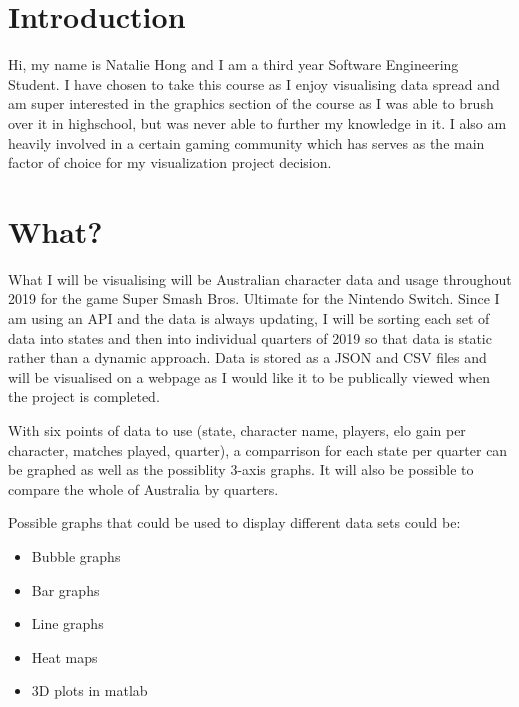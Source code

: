 \documentclass[11pt, oneside, a4paper]{article}
\begin{document}
\section*{Introduction}
Hi, my name is Natalie Hong and I am a third year Software Engineering Student. I have chosen to take this course as I enjoy visualising data spread and am super interested in the graphics section of the course as I was able to brush over it in highschool, but was never able to further my knowledge in it.
I also am heavily involved in a certain gaming community which has serves as the main factor of choice for my visualization project decision.

\section*{What?}
What I will be visualising will be Australian character data and usage throughout 2019 for the game Super Smash Bros. Ultimate for the Nintendo Switch. 
Since I am using an API and the data is always updating, I will be sorting each set of data into states and then into individual quarters of 2019 so that data is static rather than a dynamic approach.
Data is stored as a JSON and CSV files and will be visualised on a webpage as I would like it to be publically viewed when the project is completed.

With six points of data to use (state, character name, players, elo gain per character, matches played, quarter), a comparrison for each state per quarter can be graphed as well as the possiblity 3-axis graphs. It will also be possible to compare the whole of Australia by quarters.

Possible graphs that could be used to display different data sets could be:
\begin{itemize}
    \item Bubble graphs
    \item Bar graphs
    \item Line graphs
    \item Heat maps
    \item 3D plots in matlab
\end{itemize}
\end{document}
